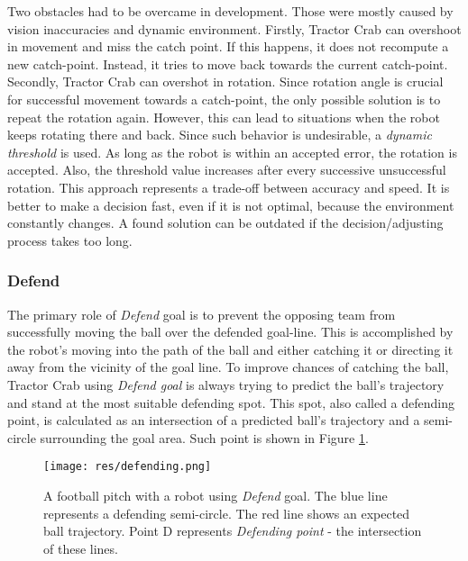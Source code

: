 Two obstacles had to be overcame in development. Those were mostly caused by
vision inaccuracies and dynamic environment. Firstly, Tractor Crab can
overshoot in movement and miss the catch point. If this happens, it does not
recompute a new catch-point. Instead, it tries to move back towards the current
catch-point. Secondly, Tractor Crab can overshot in rotation. Since rotation
angle is crucial for successful movement towards a catch-point, the only
possible solution is to repeat the rotation again. However, this can lead to
situations when the robot keeps rotating there and back. Since such behavior is
undesirable, a \emph{dynamic threshold} is used. As long as the robot is within
an accepted error, the rotation is accepted. Also, the threshold value
increases after every successive unsuccessful rotation. This approach
represents a trade-off between accuracy and speed. It is better to make a
decision fast, even if it is not optimal, because the environment constantly
changes. A found solution can be outdated if the decision/adjusting process
takes too long.

\subsubsection{Defend}

The primary role of \emph{Defend} goal is to prevent the opposing team from successfully moving the ball over the defended goal-line. This is accomplished by the robot's moving into the path of the ball and either catching it or directing it away from the vicinity of the goal line. To improve chances of catching the ball, Tractor Crab using \emph{Defend goal} is always trying to predict the ball's trajectory and stand at the most suitable defending spot. This spot, also called a defending point, is calculated as an intersection of  a predicted ball's trajectory and a semi-circle surrounding the goal area. Such point is shown in Figure \ref{fig:defendingpoint}.

\begin{figure}[H]
	\begin{center}
    \texttt{[image: res/defending.png]}
    \caption{A football pitch with a robot using \emph{Defend} goal. The blue line represents a defending semi-circle. The red line shows an expected ball trajectory. Point D represents \emph{Defending point} - the intersection of these lines.}
    \label{fig:defendingpoint}
	\end{center}
\end{figure}


